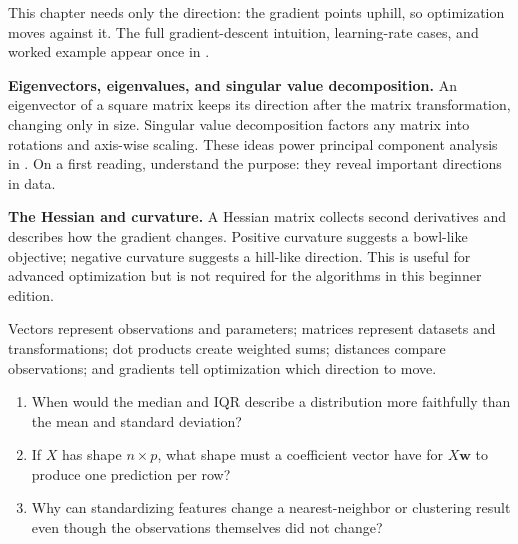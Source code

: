This chapter needs only the direction: the gradient points uphill, so optimization moves against it. The full gradient-descent intuition, learning-rate cases, and worked example appear once in .

\begin{optionaltopic}
\textbf{Eigenvectors, eigenvalues, and singular value decomposition.} An eigenvector of a square matrix keeps its direction after the matrix transformation, changing only in size. Singular value decomposition factors any matrix into rotations and axis-wise scaling. These ideas power principal component analysis in . On a first reading, understand the purpose: they reveal important directions in data.
\end{optionaltopic}

\begin{optionaltopic}
\textbf{The Hessian and curvature.} A Hessian matrix collects second derivatives and describes how the gradient changes. Positive curvature suggests a bowl-like objective; negative curvature suggests a hill-like direction. This is useful for advanced optimization but is not required for the algorithms in this beginner edition.
\end{optionaltopic}

\begin{keyidea}
Vectors represent observations and parameters; matrices represent datasets and transformations; dot products create weighted sums; distances compare observations; and gradients tell optimization which direction to move.
\end{keyidea}




\begin{quickcheck}
\begin{enumerate}
  \item When would the median and IQR describe a distribution more faithfully than the mean and standard deviation?
  \item If \(X\) has shape \(n\times p\), what shape must a coefficient vector have for \(X\bm{w}\) to produce one prediction per row?
  \item Why can standardizing features change a nearest-neighbor or clustering result even though the observations themselves did not change?
\end{enumerate}
\end{quickcheck}


